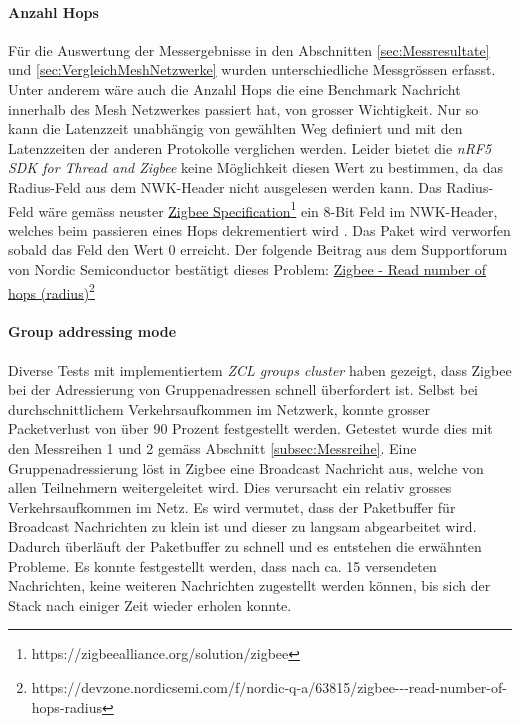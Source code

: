 \paragraph{Anzahl Hops}
Für die Auswertung der Messergebnisse in den Abschnitten \ref{sec:Messresultate} und \ref{sec:VergleichMeshNetzwerke} wurden unterschiedliche Messgrössen erfasst.
Unter anderem wäre auch die Anzahl Hops die eine Benchmark Nachricht innerhalb des Mesh Netzwerkes passiert hat, von grosser Wichtigkeit.
Nur so kann die Latenzzeit unabhängig von gewählten Weg definiert und mit den Latenzzeiten der anderen Protokolle verglichen werden.
Leider bietet die \textit{nRF5 SDK for Thread and Zigbee} keine Möglichkeit diesen Wert zu bestimmen, da das Radius-Feld aus dem NWK-Header nicht ausgelesen werden kann.
Das Radius-Feld wäre gemäss neuster \href{https://zigbeealliance.org/solution/zigbee}{Zigbee Specification\footnote{\url{https://zigbeealliance.org/solution/zigbee}\cite{the_zigbee_alliance_zigbee_2015}}} ein 8-Bit Feld im NWK-Header, welches beim passieren eines Hops dekrementiert wird \cite{the_zigbee_alliance_zigbee_2015}.
Das Paket wird verworfen sobald das Feld den Wert 0 erreicht.
Der folgende Beitrag aus dem Supportforum von Nordic Semiconductor bestätigt dieses Problem: \href{https://devzone.nordicsemi.com/f/nordic-q-a/63815/zigbee---read-number-of-hops-radius}{Zigbee - Read number of hops (radius)\footnote{\url{https://devzone.nordicsemi.com/f/nordic-q-a/63815/zigbee---read-number-of-hops-radius}\cite{cyrill_horath_zigbee_2020}}}





\paragraph{Group addressing mode}
Diverse Tests mit implementiertem \textit{ZCL groups cluster} haben gezeigt, dass Zigbee bei der Adressierung von Gruppenadressen schnell überfordert ist.
Selbst bei durchschnittlichem Verkehrsaufkommen im Netzwerk, konnte grosser Packetverlust von über 90 Prozent festgestellt werden.
Getestet wurde dies mit den Messreihen 1 und 2 gemäss Abschnitt \ref{subsec:Messreihe}.
Eine Gruppenadressierung löst in Zigbee eine Broadcast Nachricht aus, welche von allen Teilnehmern weitergeleitet wird.
Dies verursacht ein relativ grosses Verkehrsaufkommen im Netz. 
Es wird vermutet, dass der Paketbuffer für Broadcast Nachrichten zu klein ist und dieser zu langsam abgearbeitet wird.
Dadurch überläuft der Paketbuffer zu schnell und es entstehen die erwähnten Probleme.
Es konnte festgestellt werden, dass nach ca. 15 versendeten Nachrichten, keine weiteren Nachrichten zugestellt werden können, bis sich der Stack nach einiger Zeit wieder erholen konnte.

